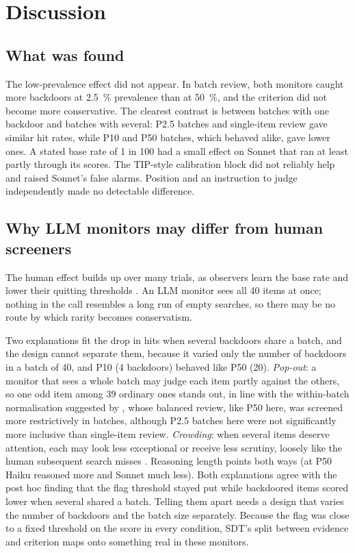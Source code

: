 \documentclass[10pt]{article}
\begin{document}
\section{Discussion}\label{sec:discussion}

\subsection{What was found}\label{sec:found}

The low-prevalence effect did not appear. In batch review, both monitors caught more backdoors at \SI{2.5}{\percent} prevalence than at \SI{50}{\percent}, and the criterion did not become more conservative. The clearest contrast is between batches with one backdoor and batches with several: P2.5 batches and single-item review gave similar hit rates, while P10 and P50 batches, which behaved alike, gave lower ones. A stated base rate of 1 in 100 had a small effect on Sonnet that ran at least partly through its scores. The TIP-style calibration block did not reliably help and raised Sonnet's false alarms. Position and an instruction to judge independently made no detectable difference.

\subsection{Why LLM monitors may differ from human screeners}\label{sec:why}

The human effect builds up over many trials, as observers learn the base rate and lower their quitting thresholds \citep{wolfe2005,wolfe2007}. An LLM monitor sees all 40 items at once; nothing in the call resembles a long run of empty searches, so there may be no route by which rarity becomes conservatism.

Two explanations fit the drop in hits when several backdoors share a batch, and the design cannot separate them, because it varied only the number of backdoors in a batch of 40, and P10 (4 backdoors) behaved like P50 (20). \emph{Pop-out}: a monitor that sees a whole batch may judge each item partly against the others, so one odd item among 39 ordinary ones stands out, in line with the within-batch normalisation suggested by \citet{hida2026}, whose balanced review, like P50 here, was screened more restrictively in batches, although P2.5 batches here were not significantly more inclusive than single-item review. \emph{Crowding}: when several items deserve attention, each may look less exceptional or receive less scrutiny, loosely like the human subsequent search misses \citep{cain2013}. Reasoning length points both ways (at P50 Haiku reasoned more and Sonnet much less). Both explanations agree with the post hoc finding that the flag threshold stayed put while backdoored items scored lower when several shared a batch. Telling them apart needs a design that varies the number of backdoors and the batch size separately. Because the flag was close to a fixed threshold on the score in every condition, SDT's split between evidence and criterion maps onto something real in these monitors.
\end{document}

